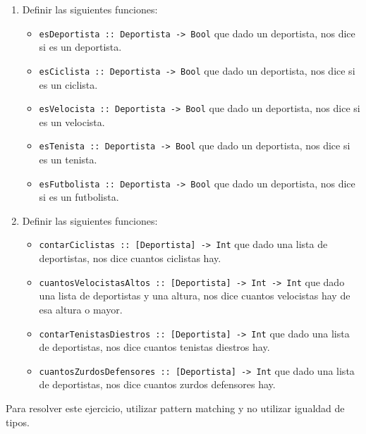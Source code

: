 \documentclass{article}
\begin{document}
\begin{enumerate}
    \item Definir las siguientes funciones:
        \begin{itemize}
            \item \texttt{esDeportista :: Deportista -> Bool} que dado un deportista, nos dice si es un deportista.
            \item \texttt{esCiclista :: Deportista -> Bool} que dado un deportista, nos dice si es un ciclista.
            \item \texttt{esVelocista :: Deportista -> Bool} que dado un deportista, nos dice si es un velocista.
            \item \texttt{esTenista :: Deportista -> Bool} que dado un deportista, nos dice si es un tenista.
            \item \texttt{esFutbolista :: Deportista -> Bool} que dado un deportista, nos dice si es un futbolista.
        \end{itemize}
    \item Definir las siguientes funciones:
        \begin{itemize}
            \item \texttt{contarCiclistas :: [Deportista] -> Int} que dado una lista de deportistas, nos dice cuantos ciclistas hay.
            \item \texttt{cuantosVelocistasAltos :: [Deportista] -> Int -> Int} que dado una lista de deportistas y una altura, nos dice cuantos velocistas hay de esa altura o mayor.
            \item \texttt{contarTenistasDiestros :: [Deportista] -> Int} que dado una lista de deportistas, nos dice cuantos tenistas diestros hay.
            \item \texttt{cuantosZurdosDefensores :: [Deportista] -> Int} que dado una lista de deportistas, nos dice cuantos zurdos defensores hay.
        \end{itemize}
\end{enumerate}

\begin{note}
    Para resolver este ejercicio, utilizar pattern matching y no utilizar igualdad de tipos.
\end{note}

\newpage
\end{document}
